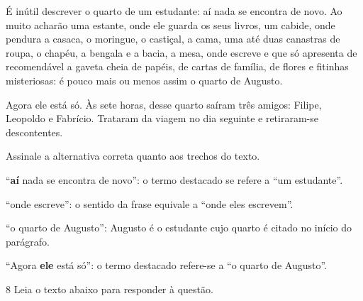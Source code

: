 
\begin{myquote}

É inútil descrever o quarto de um estudante: aí nada se
encontra de novo. Ao muito acharão uma estante, onde ele guarda
os seus livros, um cabide, onde pendura a casaca, o moringue, o
castiçal, a cama, uma até duas canastras de roupa, o chapéu, a
bengala e a bacia, a mesa, onde escreve e que só apresenta de
recomendável a gaveta cheia de papéis, de cartas de família, de
flores e fitinhas misteriosas: é pouco mais ou menos assim o
quarto de Augusto.

Agora ele está só. Às sete horas, desse quarto saíram três
amigos: Filipe, Leopoldo e Fabrício. Trataram da viagem no dia 
seguinte e retiraram-se descontentes.


\end{myquote}


Assinale a alternativa correta quanto aos trechos do texto.

\begin{escolha}
    
    \item ``\textbf{aí} nada se encontra de novo'': o termo destacado se refere a ``um estudante''.
    
    \item ``onde escreve'': o sentido da frase equivale a ``onde eles escrevem''.
    
    \item ``o quarto de Augusto'': Augusto é o estudante cujo quarto é citado no início do parágrafo.
    
    \item ``Agora \textbf{ele} está só'': o termo destacado refere-se a ``o quarto de Augusto''.

\end{escolha}

\pagebreak

\num{8} Leia o texto abaixo para responder à questão. 

